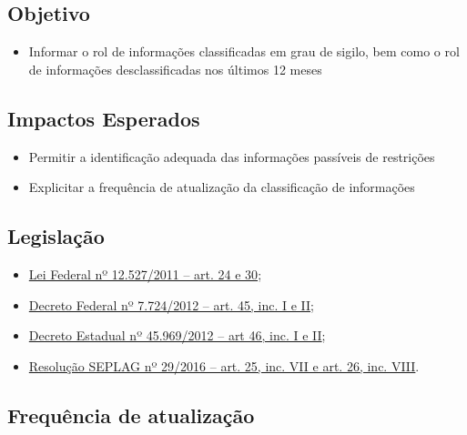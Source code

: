 \documentclass[]{book}
\providecommand{\tightlist}{%
  \setlength{\itemsep}{0pt}\setlength{\parskip}{0pt}}
\begin{document}
\hypertarget{objetivo-1}{%
\subsection{Objetivo}\label{objetivo-1}}

\begin{itemize}
\tightlist
\item
  Informar o rol de informações classificadas em grau de sigilo, bem como o rol de informações desclassificadas nos últimos 12 meses
\end{itemize}

\hypertarget{impactos-esperados-2}{%
\subsection{Impactos Esperados}\label{impactos-esperados-2}}

\begin{itemize}
\tightlist
\item
  Permitir a identificação adequada das informações passíveis de restrições
\item
  Explicitar a frequência de atualização da classificação de informações
\end{itemize}

\hypertarget{legislauxe7uxe3o-2}{%
\subsection{Legislação}\label{legislauxe7uxe3o-2}}

\begin{itemize}
\tightlist
\item
  \href{http://www.planalto.gov.br/ccivil_03/_ato2011-2014/2011/lei/l12527.htm\#art24}{Lei Federal nº 12.527/2011 -- art. 24 e 30};
\item
  \href{http://www.planalto.gov.br/ccivil_03/_ato2011-2014/2012/decreto/d7724.htm\#art45}{Decreto Federal nº 7.724/2012 -- art. 45, inc. I e II};
\item
  \href{https://www.almg.gov.br/consulte/legislacao/completa/completa.html?tipo=DEC\&num=45969\&ano=2012}{Decreto Estadual nº 45.969/2012 -- art 46, inc. I e II};
\item
  \href{http://www.planejamento.mg.gov.br/sites/default/files/documentos/resolucao_sitios_seplag_29_de_05_07_2016_1.pdf}{Resolução SEPLAG nº 29/2016 -- art. 25, inc. VII e art. 26, inc. VIII}.
\end{itemize}

\hypertarget{frequuxeancia-de-atualizauxe7uxe3o-1}{%
\subsection{Frequência de atualização}\label{frequuxeancia-de-atualizauxe7uxe3o-1}}
\end{document}
